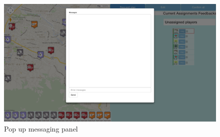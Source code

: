 \begin{figure}[h]
  \centering
  \includegraphics[width=1\textwidth]{img/study3/system/msgmode}
  \caption{Pop up messaging panel}
  \label{fig:study3msgmode}
\end{figure}


